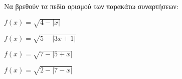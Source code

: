 Να βρεθούν τα πεδία ορισμού των παρακάτω συναρτήσεων:
\begin{alist}
\item $ f(x)=\sqrt{4-|x|} $
\item $ f(x)=\sqrt{5-|3x+1|} $
\item $ f(x)=\sqrt{7-|5+x|} $
\item $ f(x)=\sqrt{2-|7-x|} $
\end{alist}
